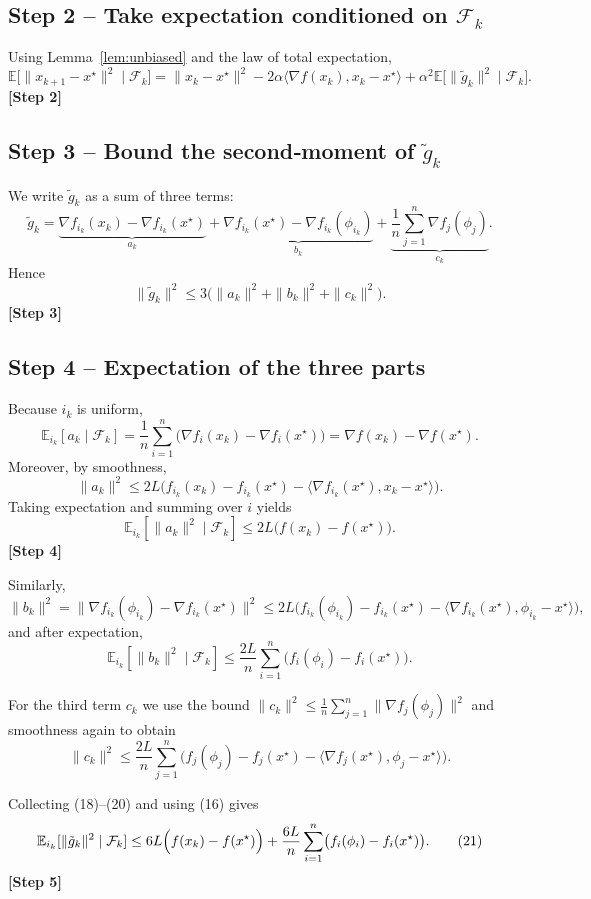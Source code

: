 \documentclass{article}
\newcommand{\E}{\mathbb{E}}
\begin{document}
\subsection*{Step 2 – Take expectation conditioned on $\mathcal F_k$}
Using Lemma~\ref{lem:unbiased} and the law of total expectation,
\[
\E\bigl[\|x_{k+1}-x^\star\|^2\mid\mathcal F_k\bigr]
= \|x_k-x^\star\|^2-2\alpha\langle\nabla f(x_k),x_k-x^\star\rangle
+\alpha^2\E\bigl[\|\tilde g_k\|^2\mid\mathcal F_k\bigr].
\tag{15}
\]
\textbf{[Step 2]}

\subsection*{Step 3 – Bound the second‑moment of $\tilde g_k$}
We write $\tilde g_k$ as a sum of three terms:
\[
\tilde g_k=\underbrace{\nabla f_{i_k}(x_k)-\nabla f_{i_k}(x^\star)}_{a_k}
+\underbrace{\nabla f_{i_k}(x^\star)-\nabla f_{i_k}(\phi_{i_k})}_{b_k}
+\underbrace{\frac1n\sum_{j=1}^{n}\nabla f_j(\phi_j)}_{c_k}.
\]
Hence
\[
\|\tilde g_k\|^2\le 3\bigl(\|a_k\|^2+\|b_k\|^2+\|c_k\|^2\bigr).
\tag{16}
\]
\textbf{[Step 3]}

\subsection*{Step 4 – Expectation of the three parts}
Because $i_k$ is uniform,
\[
\E_{i_k}[a_k\mid\mathcal F_k]=\frac1n\sum_{i=1}^{n}\bigl(\nabla f_i(x_k)-\nabla f_i(x^\star)\bigr)=\nabla f(x_k)-\nabla f(x^\star).
\]
Moreover, by smoothness,
\[
\|a_k\|^2\le 2L\bigl(f_{i_k}(x_k)-f_{i_k}(x^\star)-\langle\nabla f_{i_k}(x^\star),x_k-x^\star\rangle\bigr).
\tag{17}
\]
Taking expectation and summing over $i$ yields
\[
\E_{i_k}[\|a_k\|^2\mid\mathcal F_k]\le 2L\bigl(f(x_k)-f(x^\star)\bigr).
\tag{18}
\]
\textbf{[Step 4]}

Similarly,
\[
\|b_k\|^2=\|\nabla f_{i_k}(\phi_{i_k})-\nabla f_{i_k}(x^\star)\|^2
\le 2L\bigl(f_{i_k}(\phi_{i_k})-f_{i_k}(x^\star)-\langle\nabla f_{i_k}(x^\star),\phi_{i_k}-x^\star\rangle\bigr),
\]
and after expectation,
\[
\E_{i_k}[\|b_k\|^2\mid\mathcal F_k]\le
\frac{2L}{n}\sum_{i=1}^{n}\bigl(f_i(\phi_i)-f_i(x^\star)\bigr).
\tag{19}
\]

For the third term $c_k$ we use the bound $\|c_k\|^2\le\frac{1}{n}\sum_{j=1}^{n}\|\nabla f_j(\phi_j)\|^2$ and smoothness again to obtain  
\[
\|c_k\|^2\le\frac{2L}{n}\sum_{j=1}^{n}\bigl(f_j(\phi_j)-f_j(x^\star)-\langle\nabla f_j(x^\star),\phi_j-x^\star\rangle\bigr).
\tag{20}
\]

Collecting (18)–(20) and using (16) gives
\[
\E_{i_k}[\|\tilde g_k\|^2\mid\mathcal F_k]\le
6L\Bigl(f(x_k)-f(x^\star)\Bigr)
+\frac{6L}{n}\sum_{i=1}^{n}\bigl(f_i(\phi_i)-f_i(x^\star)\bigr).
\tag{21}
\]
\textbf{[Step 5]}
\end{document}
